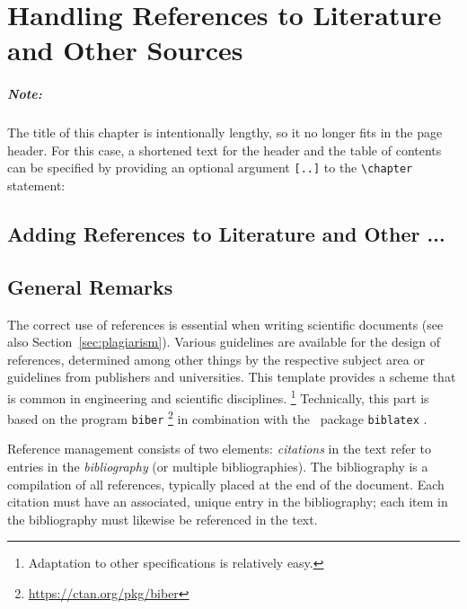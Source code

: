 \chapter[References to Literature]{Handling References to Literature and Other Sources}
\label{cha:Literature}

\paragraph{Note:} The title of this chapter is intentionally lengthy, so it no
longer fits in the page header. For this case, a shortened text for the header
and the table of contents can be specified by providing an
optional argument \verb![..]! to the \verb!\chapter! statement:
%
\begin{LaTeXCode}[numbers=none]
\chapter[References to Literature]{Adding References to Literature and Other ...}
\end{LaTeXCode}


\section{General Remarks}

The correct use of references is essential when writing scientific documents
(see also Section~\ref{sec:plagiarism}). Various guidelines are available for
the design of references, determined among other things by the respective 
subject area or guidelines from publishers and universities. 
This template provides a scheme that is common in engineering and scientific
disciplines.%
\footnote{Adaptation to other specifications is relatively easy.}
Technically, this part is based on the program \texttt{biber}%
\footnote{\url{https://ctan.org/pkg/biber}}
in combination with the \latex\ package \texttt{biblatex} \cite{Kime2022}.

Reference management consists of two elements: \emph{citations} in the text
refer to entries in the \emph{bibliography} (or multiple bibliographies). The
bibliography is a compilation of all references, typically placed at the end of
the document. Each citation must have an associated, unique entry in the
bibliography; each item in the bibliography must likewise be referenced in the
text.



